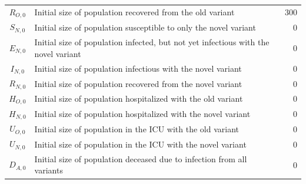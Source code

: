 \begin{tabularx}{\columnwidth}{cXr}
\( R_{O,0} \) & Initial size of population recovered from the old variant & 300 \\
\( S_{N,0} \) & Initial size of population susceptible to only the novel variant & 0 \\
\( E_{N,0} \) & Initial size of population infected, but not yet infectious with the novel variant & 0 \\
\( I_{N,0} \) & Initial size of population infectious with the novel variant & 0 \\
\( R_{N,0} \) & Initial size of population recovered from the novel variant & 0 \\
\( H_{O,0} \) & Initial size of population hospitalized with the old variant & 0 \\
\( H_{N,0} \) & Initial size of population hospitalized with the novel variant & 0 \\
\( U_{O,0} \) & Initial size of population in the ICU with the old variant & 0 \\
\( U_{N,0} \) & Initial size of population in the ICU with the novel variant & 0 \\
\( D_{A,0} \) & Initial size of population deceased due to infection from all variants & 0
\label{ch_5:tbl:simulation_parameters_and_interpretations}
\end{tabularx}

